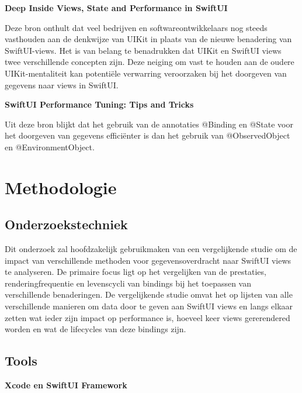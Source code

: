 \textbf{Deep Inside Views, State and Performance in SwiftUI~\autocite{Long2020}}

Deze bron onthult dat veel bedrijven en softwareontwikkelaars nog steeds vasthouden aan de denkwijze van UIKit in plaats van de nieuwe benadering van SwiftUI-views. Het is van belang te benadrukken dat UIKit en SwiftUI views twee verschillende concepten zijn. Deze neiging om vast te houden aan de oudere UIKit-mentaliteit kan potentiële verwarring veroorzaken bij het doorgeven van gegevens naar views in SwiftUI.

\textbf{SwiftUI Performance Tuning: Tips and Tricks\newline ~\autocite{Amisha2022}}

Uit deze bron blijkt dat het gebruik van de annotaties @Binding en @State voor het doorgeven van gegevens efficiënter is dan het gebruik van @ObservedObject en @EnvironmentObject.






\section{Methodologie}%
\label{sec:methodologie}

\subsection{Onderzoekstechniek}
Dit onderzoek zal hoofdzakelijk gebruikmaken van een vergelijkende studie om de impact van verschillende methoden voor gegevensoverdracht naar SwiftUI views te analyseren. De primaire focus ligt op het vergelijken van de prestaties, renderingfrequentie en levenscycli van bindings bij het toepassen van verschillende benaderingen. De vergelijkende studie omvat het op lijsten van alle verschillende manieren om data door te geven aan SwiftUI views en langs elkaar zetten wat ieder zijn impact op performance is, hoeveel keer views gererendered  worden en wat de lifecycles van deze bindings zijn. 

\subsection{Tools}
\textbf{Xcode en SwiftUI Framework}

